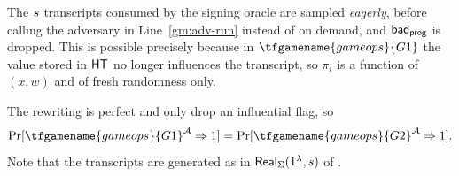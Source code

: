 The $s$ transcripts consumed by the signing oracle are sampled
\emph{eagerly}, before calling the adversary in Line~\ref{gm:adv-run} instead of on demand, and $\mathsf{bad}_\mathsf{prog}$
is dropped. This is possible precisely because in
$\tfgamename{gameops}{G1}$ the value stored in $\mathsf{HT}$ no longer influences the
transcript, so $\pi_i$ is a function of $(x,w)$ and of fresh randomness only.

The rewriting is perfect and only drop an influential flag, so
\begin{equation}\label{eq:g1g2}
    \Pr[\tfgamename{gameops}{G1}^\adv \Rightarrow 1] = \Pr[\tfgamename{gameops}{G2}^\adv \Rightarrow 1].
\end{equation}
Note that the transcripts are generated as in $\mathsf{Real}_\Sigma(1^{\lambda}, s)$ of .
